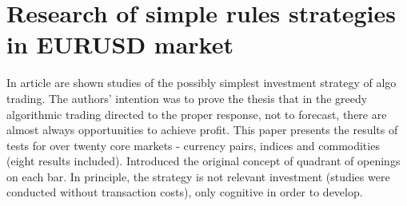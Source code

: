 \chapter{Research of simple rules strategies in EURUSD market}
\label{chapter2SimpleRulesEURUSD} %

In article are shown studies of the possibly simplest investment strategy of algo trading. The authors' intention was to prove the thesis that in the greedy algorithmic trading directed to the proper response, not to forecast, there are almost always opportunities to achieve profit. This paper presents the results of tests for over twenty core markets - currency pairs, indices and commodities (eight results included). Introduced the original concept of quadrant of openings on each bar. In principle, the strategy is not relevant investment (studies were conducted without transaction costs), only cognitive in order to develop.

